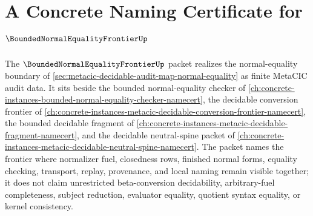 \chapter{A Concrete Naming Certificate for $\BoundedNormalEqualityFrontierUp$}
\label{ch:concrete-instances-bounded-normal-equality-frontier-namecert}

The $\BoundedNormalEqualityFrontierUp$ packet realizes the normal-equality boundary of \autoref{sec:metacic-decidable-audit-map-normal-equality} as finite MetaCIC audit data. It sits beside the bounded normal-equality checker of \autoref{ch:concrete-instances-bounded-normal-equality-checker-namecert}, the decidable conversion frontier of \autoref{ch:concrete-instances-metacic-decidable-conversion-frontier-namecert}, the bounded decidable fragment of \autoref{ch:concrete-instances-metacic-decidable-fragment-namecert}, and the decidable neutral-spine packet of \autoref{ch:concrete-instances-metacic-decidable-neutral-spine-namecert}. The packet names the frontier where normalizer fuel, closedness rows, finished normal forms, equality checking, transport, replay, provenance, and local naming remain visible together; it does not claim unrestricted beta-conversion decidability, arbitrary-fuel completeness, subject reduction, evaluator equality, quotient syntax equality, or kernel consistency.

